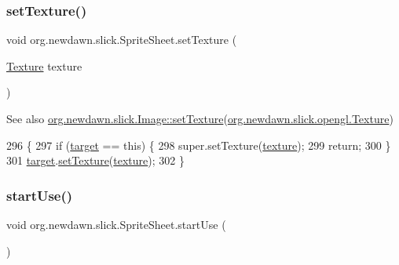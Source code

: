 \subsubsection{\texorpdfstring{set\+Texture()}{setTexture()}}
{\footnotesize\ttfamily void org.\+newdawn.\+slick.\+Sprite\+Sheet.\+set\+Texture (\begin{DoxyParamCaption}\item[{\mbox{\hyperlink{interfaceorg_1_1newdawn_1_1slick_1_1opengl_1_1_texture}{Texture}}}]{texture }\end{DoxyParamCaption})\hspace{0.3cm}{\ttfamily [inline]}}

\begin{DoxySeeAlso}{See also}
\mbox{\hyperlink{classorg_1_1newdawn_1_1slick_1_1_image_a73b8afaa9bb100680f5bec87f4a75cdb}{org.\+newdawn.\+slick.\+Image\+::set\+Texture}}(\mbox{\hyperlink{interfaceorg_1_1newdawn_1_1slick_1_1opengl_1_1_texture}{org.\+newdawn.\+slick.\+opengl.\+Texture}}) 
\end{DoxySeeAlso}

\begin{DoxyCode}
296                                             \{
297         \textcolor{keywordflow}{if} (\mbox{\hyperlink{classorg_1_1newdawn_1_1slick_1_1_sprite_sheet_a54e0b09e9140db02bc11ac22fff5d464}{target}} == \textcolor{keyword}{this}) \{
298             super.setTexture(\mbox{\hyperlink{classorg_1_1newdawn_1_1slick_1_1_image_a9fd9ddb21247305c83ac4e37d9d51f79}{texture}});
299             \textcolor{keywordflow}{return};
300         \}
301         \mbox{\hyperlink{classorg_1_1newdawn_1_1slick_1_1_sprite_sheet_a54e0b09e9140db02bc11ac22fff5d464}{target}}.\mbox{\hyperlink{classorg_1_1newdawn_1_1slick_1_1_image_a73b8afaa9bb100680f5bec87f4a75cdb}{setTexture}}(\mbox{\hyperlink{classorg_1_1newdawn_1_1slick_1_1_image_a9fd9ddb21247305c83ac4e37d9d51f79}{texture}});
302     \}
\end{DoxyCode}
\mbox{\label{classorg_1_1newdawn_1_1slick_1_1_sprite_sheet_a71347c9175fad7bb725d5a4730a4e698}} 
\subsubsection{\texorpdfstring{start\+Use()}{startUse()}}
{\footnotesize\ttfamily void org.\+newdawn.\+slick.\+Sprite\+Sheet.\+start\+Use (\begin{DoxyParamCaption}{ }\end{DoxyParamCaption})\hspace{0.3cm}{\ttfamily [inline]}}

